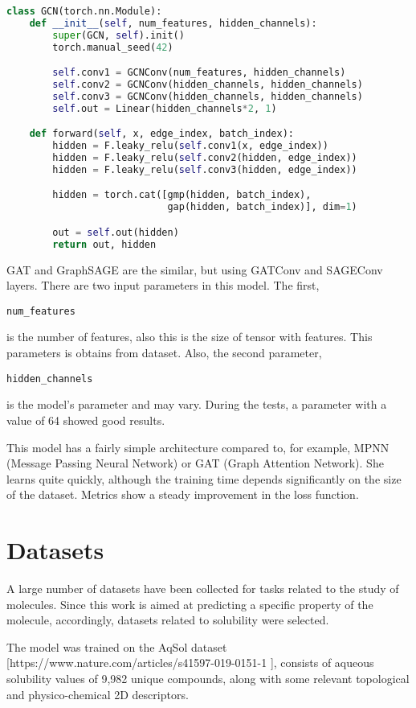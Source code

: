 \documentclass[a4paper,14pt]{article}
\begin{document}
\begin{lstlisting}[language=Python]
class GCN(torch.nn.Module):
    def __init__(self, num_features, hidden_channels):
        super(GCN, self).init()
        torch.manual_seed(42)

        self.conv1 = GCNConv(num_features, hidden_channels)
        self.conv2 = GCNConv(hidden_channels, hidden_channels)
        self.conv3 = GCNConv(hidden_channels, hidden_channels)
        self.out = Linear(hidden_channels*2, 1)

    def forward(self, x, edge_index, batch_index):
        hidden = F.leaky_relu(self.conv1(x, edge_index))
        hidden = F.leaky_relu(self.conv2(hidden, edge_index))
        hidden = F.leaky_relu(self.conv3(hidden, edge_index))

        hidden = torch.cat([gmp(hidden, batch_index), 
                            gap(hidden, batch_index)], dim=1)

        out = self.out(hidden)
        return out, hidden
\end{lstlisting}

GAT and GraphSAGE are the similar, but using GATConv and SAGEConv layers.
There are two input parameters in this model. The first, \begin{verbatim}num_features\end{verbatim} is the number of features, also this is the size of tensor with features. This parameters is obtains from dataset.
Also, the second parameter, \begin{verbatim}hidden_channels\end{verbatim} is the model's parameter and may vary. During the tests, a parameter with a value of 64 showed good results.

This model has a fairly simple architecture compared to, for example, MPNN (Message Passing Neural Network) or GAT (Graph Attention Network). She learns quite quickly, although the training time depends significantly on the size of the dataset. Metrics show a steady improvement in the loss function.

\section{Datasets}
A large number of datasets have been collected for tasks related to the study of molecules. Since this work is aimed at predicting a specific property of the molecule, accordingly, datasets related to solubility were selected.

The model was trained on the AqSol dataset [https://www.nature.com/articles/s41597-019-0151-1 ], consists of aqueous solubility values of 9,982 unique compounds, along with some relevant topological and physico-chemical 2D descriptors. 
\end{document}
